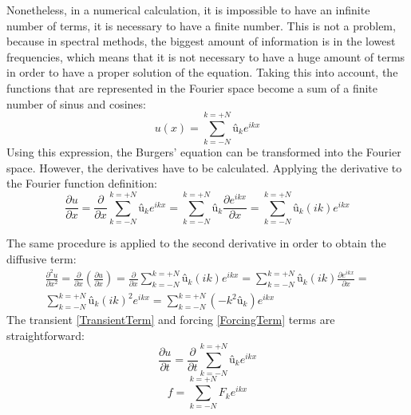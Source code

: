 Nonetheless, in a numerical calculation, it is impossible to have an infinite number of terms, it is necessary to have a finite number. This is not a problem, because in spectral methods, the biggest amount of information is in the lowest frequencies, which means that it is not necessary to have a huge amount of terms in order to have a proper solution of the equation. Taking this into account, the functions that are represented in the Fourier space become a sum of a finite number of sinus and cosines:
\begin{equation}
u\left(x\right)=\sum_{k=-N}^{k=+N}û_{k}e^{ikx}
\end{equation}
Using this expression, the Burgers' equation can be transformed into the Fourier space. However, the derivatives have to be calculated. Applying the derivative to the Fourier function definition:
\begin{equation}
\frac{\partial u}{\partial x}=\frac{\partial}{\partial x}\sum_{k=-N}^{k=+N}û_{k}e^{ikx}=\sum_{k=-N}^{k=+N}û_{k}\frac{\partial e^{ikx}}{\partial x}=\sum_{k=-N}^{k=+N}û_{k}\left(ik\right)e^{ikx}
\end{equation}

The same procedure is applied to the second derivative in order to obtain the diffusive term:
\begin{multline}
\frac{\partial^{2}u}{\partial x^{2}}=\frac{\partial}{\partial x}\left(\frac{\partial u}{\partial x}\right)=\frac{\partial}{\partial x}\sum_{k=-N}^{k=+N}û_{k}\left(ik\right)e^{ikx}=\sum_{k=-N}^{k=+N}û_{k}\left(ik\right)\frac{\partial e^{ikx}}{\partial x}= \\
\sum_{k=-N}^{k=+N}û_{k}\left(ik\right)^{2}e^{ikx}=\sum_{k=-N}^{k=+N}\left(-k^{2}û_{k}\right)e^{ikx}
\end{multline}
The transient \ref{TransientTerm} and forcing \ref{ForcingTerm} terms are straightforward:
\begin{equation}
\frac{\partial u}{\partial t}=\frac{\partial}{\partial t}\sum_{k=-N}^{k=+N}û_{k}e^{ikx}
\label{TransientTerm}
\end{equation}
\begin{equation}
f=\sum_{k=-N}^{k=+N}F_{k}e^{ikx}
\label{ForcingTerm}
\end{equation}


